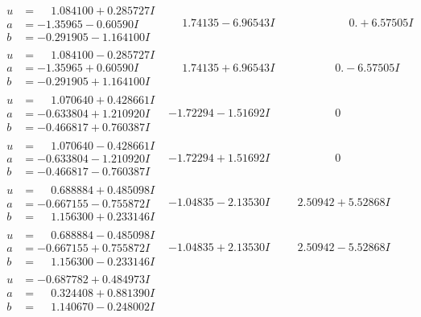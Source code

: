 \documentclass[1p]{elsarticle_modified}
\theoremstyle{definition}
\begin{document}
$$\begin{array}{c|c|c}
\begin{aligned}
u &= \phantom{-}1.084100 + 0.285727 I \\
a &= -1.35965 - 0.60590 I \\
b &= -0.291905 - 1.164100 I\end{aligned}
 & \phantom{-}1.74135 - 6.96543 I & \phantom{-0.000000 -}0. + 6.57505 I \\ \hline\begin{aligned}
u &= \phantom{-}1.084100 - 0.285727 I \\
a &= -1.35965 + 0.60590 I \\
b &= -0.291905 + 1.164100 I\end{aligned}
 & \phantom{-}1.74135 + 6.96543 I & \phantom{-0.000000 } 0. - 6.57505 I \\ \hline\begin{aligned}
u &= \phantom{-}1.070640 + 0.428661 I \\
a &= -0.633804 + 1.210920 I \\
b &= -0.466817 + 0.760387 I\end{aligned}
 & -1.72294 - 1.51692 I & \phantom{-0.000000 } 0 \\ \hline\begin{aligned}
u &= \phantom{-}1.070640 - 0.428661 I \\
a &= -0.633804 - 1.210920 I \\
b &= -0.466817 - 0.760387 I\end{aligned}
 & -1.72294 + 1.51692 I & \phantom{-0.000000 } 0 \\ \hline\begin{aligned}
u &= \phantom{-}0.688884 + 0.485098 I \\
a &= -0.667155 - 0.755872 I \\
b &= \phantom{-}1.156300 + 0.233146 I\end{aligned}
 & -1.04835 - 2.13530 I & \phantom{-}2.50942 + 5.52868 I \\ \hline\begin{aligned}
u &= \phantom{-}0.688884 - 0.485098 I \\
a &= -0.667155 + 0.755872 I \\
b &= \phantom{-}1.156300 - 0.233146 I\end{aligned}
 & -1.04835 + 2.13530 I & \phantom{-}2.50942 - 5.52868 I \\ \hline\begin{aligned}
u &= -0.687782 + 0.484973 I \\
a &= \phantom{-}0.324408 + 0.881390 I \\
b &= \phantom{-}1.140670 - 0.248002 I\end{aligned}

\end{array}$$
\end{document}

